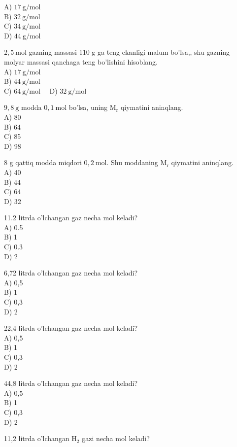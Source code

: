 A) $17 \mathrm{~g} / \mathrm{mol}$\\
B) $32 \mathrm{~g} / \mathrm{mol}$\\
C) $34 \mathrm{~g} / \mathrm{mol}$\\
D) $44 \mathrm{~g} / \mathrm{mol}$
  \item $2,5 \mathrm{~mol}$ gazning massasi 110 g ga teng ekanligi malum bo'lsa,, shu gazning molyar massasi qanchaga teng bo'lishini hisoblang.\\
A) $17 \mathrm{~g} / \mathrm{mol}$\\
B) $44 \mathrm{~g} / \mathrm{mol}$\\
C) $64 \mathrm{~g} / \mathrm{mol} \quad$ D) $32 \mathrm{~g} / \mathrm{mol}$
  \item $9,8 \mathrm{~g}$ modda $0,1 \mathrm{~mol}$ bo'lsa, uning $\mathrm{M}_{\mathrm{r}}$ qiymatini aninqlang.\\
A) 80\\
B) 64\\
C) 85\\
D) 98
  \item 8 g qattiq modda miqdori $0,2 \mathrm{~mol}$. Shu moddaning $\mathrm{M}_{\mathrm{r}}$ qiymatini aninqlang.\\
A) 40\\
B) 44\\
C) 64\\
D) 32
  \item 11.2 litrda o'lchangan gaz necha mol keladi?\\
A) 0.5\\
B) 1\\
C) 0.3\\
D) 2\\
  \item 6,72 litrda o'lchangan gaz necha mol keladi?\\
A) 0,5\\
B) 1\\
C) 0,3\\
D) 2
  \item 22,4 litrda o'lchangan gaz necha mol keladi?\\
A) 0,5\\
B) 1\\
C) 0,3\\
D) 2
  \item 44,8 litrda o'lchangan gaz necha mol keladi?\\
A) 0,5\\
B) 1\\
C) 0,3\\
D) 2
  \item 11,2 litrda o'lchangan $\mathrm{H}_{2}$ gazi necha mol keladi?\\
